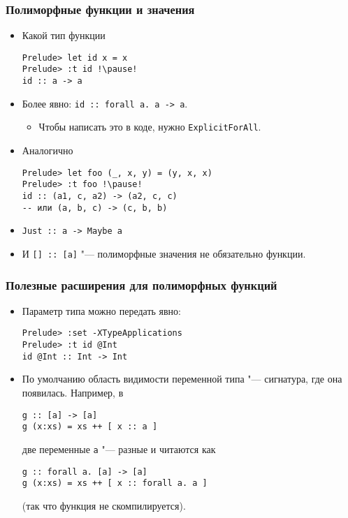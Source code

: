 \documentclass[10pt]{beamer}
\begin{document}
\begin{frame}[fragile]
\frametitle{Полиморфные функции и значения}
\begin{itemize}
    \item Какой тип функции
\begin{lstlisting}
Prelude> let id x = x
Prelude> :t id !\pause!
id :: a -> a
\end{lstlisting}
\item Более явно: \lstinline|id :: forall a. a -> a|.
\begin{itemize}
\item Чтобы написать это в коде, нужно \lstinline|ExplicitForAll|.
\end{itemize}
\item Аналогично
\begin{lstlisting}
Prelude> let foo (_, x, y) = (y, x, x)
Prelude> :t foo !\pause!
id :: (a1, c, a2) -> (a2, c, c) 
-- или (a, b, c) -> (c, b, b)
\end{lstlisting}
\item \lstinline|Just :: a -> Maybe a|
\item И \lstinline|[] :: [a]| "--- полиморфные значения не обязательно функции.
\end{itemize}
\end{frame}

\begin{frame}[fragile]
\frametitle{Полезные расширения для полиморфных функций}
\begin{itemize}
    \item Параметр типа можно передать явно:
\begin{lstlisting}
Prelude> :set -XTypeApplications
Prelude> :t id @Int
id @Int :: Int -> Int
\end{lstlisting}
    \pause
    \item По умолчанию область видимости переменной типа "--- сигнатура, где она появилась. Например, в
\begin{lstlisting}
g :: [a] -> [a]
g (x:xs) = xs ++ [ x :: a ]
\end{lstlisting}
    \pause
    две переменные \lstinline|a| "--- разные и читаются как
\begin{lstlisting}
g :: forall a. [a] -> [a]
g (x:xs) = xs ++ [ x :: forall a. a ]
\end{lstlisting}
    \pause
    (так что функция не скомпилируется). 
\end{itemize}
\end{frame}
\end{document}
